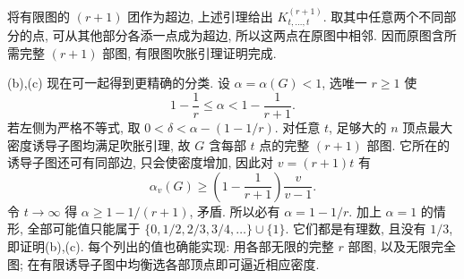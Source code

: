 \begin{solution}
将有限图的 $(r+1)$ 团作为超边, 上述引理给出
$K^{(r+1)}_{t,\ldots,t}$.
取其中任意两个不同部分的点, 可从其他部分各添一点成为超边,
所以这两点在原图中相邻. 因而原图含所需完整 $(r+1)$ 部图,
有限图吹胀引理证明完成.

(b),(c) 现在可一起得到更精确的分类.
设 $\alpha=\alpha(G)<1$, 选唯一 $r\ge1$ 使
\[
1-\frac1r\le\alpha<1-\frac1{r+1}.
\]
若左侧为严格不等式, 取
$0<\delta<\alpha-(1-1/r)$.
对任意 $t$, 足够大的 $n$ 顶点最大密度诱导子图均满足吹胀引理,
故 $G$ 含每部 $t$ 点的完整 $(r+1)$ 部图.
它所在的诱导子图还可有同部边, 只会使密度增加,
因此对 $v=(r+1)t$ 有
\[
\alpha_v(G)\ge\left(1-\frac1{r+1}\right)\frac v{v-1}.
\]
令 $t\to\infty$ 得 $\alpha\ge1-1/(r+1)$, 矛盾.
所以必有 $\alpha=1-1/r$. 加上 $\alpha=1$ 的情形,
全部可能值只能属于
$\{0,1/2,2/3,3/4,\ldots\}\cup\{1\}$.
它们都是有理数, 且没有 $1/3$, 即证明(b),(c).
每个列出的值也确能实现: 用各部无限的完整 $r$ 部图, 以及无限完全图;
在有限诱导子图中均衡选各部顶点即可逼近相应密度.
\end{solution}
